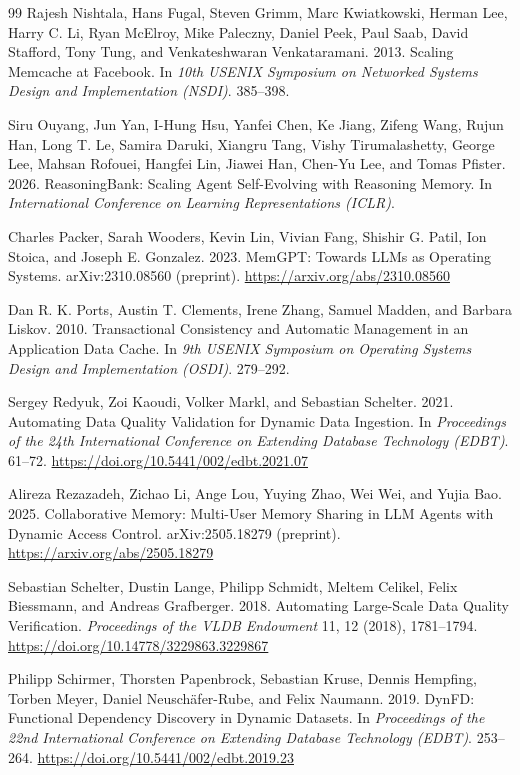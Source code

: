\begin{thebibliography}{99}
Rajesh Nishtala, Hans Fugal, Steven Grimm, Marc Kwiatkowski, Herman Lee, Harry C. Li, Ryan McElroy, Mike Paleczny, Daniel Peek, Paul Saab, David Stafford, Tony Tung, and Venkateshwaran Venkataramani. 2013. Scaling Memcache at Facebook. In \emph{10th USENIX Symposium on Networked Systems Design and Implementation (NSDI)}. 385--398.

Siru Ouyang, Jun Yan, I-Hung Hsu, Yanfei Chen, Ke Jiang, Zifeng Wang, Rujun Han, Long T. Le, Samira Daruki, Xiangru Tang, Vishy Tirumalashetty, George Lee, Mahsan Rofouei, Hangfei Lin, Jiawei Han, Chen-Yu Lee, and Tomas Pfister. 2026. ReasoningBank: Scaling Agent Self-Evolving with Reasoning Memory. In \emph{International Conference on Learning Representations (ICLR)}.

Charles Packer, Sarah Wooders, Kevin Lin, Vivian Fang, Shishir G. Patil, Ion Stoica, and Joseph E. Gonzalez. 2023. MemGPT: Towards LLMs as Operating Systems. arXiv:2310.08560 (preprint). \url{https://arxiv.org/abs/2310.08560}

Dan R. K. Ports, Austin T. Clements, Irene Zhang, Samuel Madden, and Barbara Liskov. 2010. Transactional Consistency and Automatic Management in an Application Data Cache. In \emph{9th USENIX Symposium on Operating Systems Design and Implementation (OSDI)}. 279--292.

Sergey Redyuk, Zoi Kaoudi, Volker Markl, and Sebastian Schelter. 2021. Automating Data Quality Validation for Dynamic Data Ingestion. In \emph{Proceedings of the 24th International Conference on Extending Database Technology (EDBT)}. 61--72. \url{https://doi.org/10.5441/002/edbt.2021.07}

Alireza Rezazadeh, Zichao Li, Ange Lou, Yuying Zhao, Wei Wei, and Yujia Bao. 2025. Collaborative Memory: Multi-User Memory Sharing in LLM Agents with Dynamic Access Control. arXiv:2505.18279 (preprint). \url{https://arxiv.org/abs/2505.18279}

Sebastian Schelter, Dustin Lange, Philipp Schmidt, Meltem Celikel, Felix Biessmann, and Andreas Grafberger. 2018. Automating Large-Scale Data Quality Verification. \emph{Proceedings of the VLDB Endowment} 11, 12 (2018), 1781--1794. \url{https://doi.org/10.14778/3229863.3229867}

Philipp Schirmer, Thorsten Papenbrock, Sebastian Kruse, Dennis Hempfing, Torben Meyer, Daniel Neusch{\"a}fer-Rube, and Felix Naumann. 2019. DynFD: Functional Dependency Discovery in Dynamic Datasets. In \emph{Proceedings of the 22nd International Conference on Extending Database Technology (EDBT)}. 253--264. \url{https://doi.org/10.5441/002/edbt.2019.23}


\end{thebibliography}
